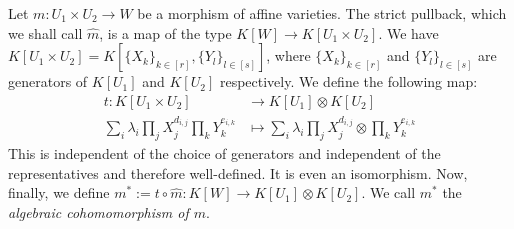 \begin{definition}\label{coh}
  Let $m \colon U_1 \times U_2 \longrightarrow W$ be a morphism of affine varieties.
  The strict pullback, which we shall call $\hat{m}$, is a map of the type $K[W] \longrightarrow K[U_1 \times U_2]$.
  We have $ K[U_1 \times U_2] = K[\{X_k\}_{k\in[r]},\{Y_l\}_{l\in[s]}]$, where $\{X_k\}_{k\in[r]}$ and $\{Y_l\}_{l\in[s]}$ are generators of $K[U_1]$ and $K[U_2]$ respectively.
  We define the following map:
    \begin{equation}
    \begin{aligned}
      t \colon K[U_1 \times U_2]
      & \longrightarrow K[U_1] \otimes K[U_2]\\
      \sum_i \lambda_i \prod_j X_{j}^{d_{i,j}} \prod_k Y_{k}^{e_{i,k}} &\longmapsto \sum_i \lambda_i \prod_j X_{j}^{d_{i,j}} \otimes \prod_k Y_{k}^{e_{i,k}}
    \end{aligned}
  \end{equation}
  This is independent of the choice of generators and independent of the representatives and therefore well-defined.
  It is even an isomorphism.
  Now, finally, we define $m^\ast := t \circ \hat{m} : K[W] \longrightarrow K[U_1] \otimes K[U_2]$.
  We call $m^\ast$ the \textit{algebraic cohomomorphism of $m$}.
\end{definition}

